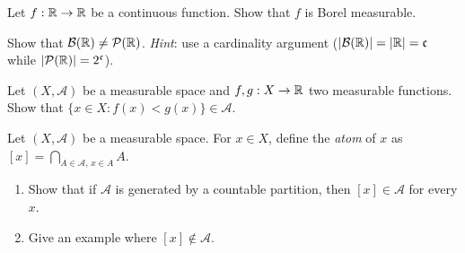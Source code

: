 \begin{exercise}
Let $f : \mathbb{R} \to \mathbb{R}$ be a continuous function. Show that $f$ is Borel measurable.
\end{exercise}

\begin{exercise}
Show that $\mathcal{B}(\mathbb{R}) \neq \mathcal{P}(\mathbb{R})$.
\emph{Hint}: use a cardinality argument ($\left| \mathcal{B}(\mathbb{R}) \right| = \left| \mathbb{R} \right| =
\mathfrak{c}$ while $\left| \mathcal{P}(\mathbb{R}) \right| = 2^{\mathfrak{c}}$).
\end{exercise}

\begin{exercise}
Let $(X, \mathcal{A})$ be a measurable space and $f, g : X \to \mathbb{R}$ two measurable
functions. Show that $\{x \in X : f(x) < g(x)\} \in \mathcal{A}$.
\end{exercise}

\begin{exercise}
Let $(X, \mathcal{A})$ be a measurable space. For $x \in X$, define the
\emph{atom} of $x$ as $[x] = \bigcap_{A \in \mathcal{A},\, x \in A} A$.
\begin{enumerate}
    \item Show that if $\mathcal{A}$ is generated by a countable partition, then
    $[x] \in \mathcal{A}$ for every $x$.
    \item Give an example where $[x] \notin \mathcal{A}$.
\end{enumerate}
\end{exercise}
